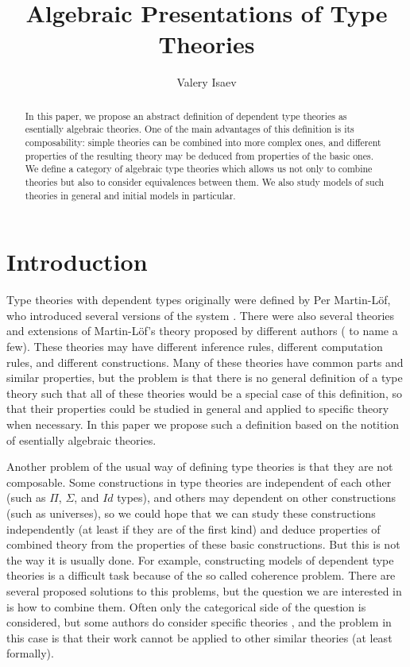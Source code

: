 \documentclass[reqno]{amsart}
\theoremstyle{definition}
\theoremstyle{remark}
\numberwithin{figure}{section}
\begin{document}
\title{Algebraic Presentations of Type Theories}

\author{Valery Isaev}

\begin{abstract}
In this paper, we propose an abstract definition of dependent type theories as esentially algebraic theories.
One of the main advantages of this definition is its composability: simple theories can be combined into more complex ones,
and different properties of the resulting theory may be deduced from properties of the basic ones.
We define a category of algebraic type theories which allows us not only to combine theories but also to consider equivalences between them.
We also study models of such theories in general and initial models in particular.
\end{abstract}

\maketitle

 \makeatletter
    \providecommand\@dotsep{5}
  \makeatother
  \listoftodos\relax

\section{Introduction}

Type theories with dependent types originally were defined by Per Martin-L\"{o}f, who introduced several versions of the system \cite{MLTT72,MLTT73,MLTT79}.
There were also several theories and extensions of Martin-L\"{o}f's theory proposed by different authors (\cite{CoC,luo94} to name a few).
These theories may have different inference rules, different computation rules, and different constructions.
Many of these theories have common parts and similar properties,
but the problem is that there is no general definition of a type theory such that all of these theories would be a special case of this definition,
so that their properties could be studied in general and applied to specific theory when necessary.
In this paper we propose such a definition based on the notition of esentially algebraic theories.

Another problem of the usual way of defining type theories is that they are not composable.
Some constructions in type theories are independent of each other (such as $\Pi$, $\Sigma$, and $Id$ types),
and others may dependent on other constructions (such as universes),
so we could hope that we can study these constructions independently (at least if they are of the first kind)
and deduce properties of combined theory from the properties of these basic constructions.
But this is not the way it is usually done.
For example, constructing models of dependent type theories is a difficult task because of the so called coherence problem.
There are several proposed solutions to this problems, but the question we are interested in is how to combine them.
Often only the categorical side of the question is considered,
but some authors do consider specific theories \cite{streicher,pitts},
and the problem in this case is that their work cannot be applied to other similar theories (at least formally).
\end{document}
